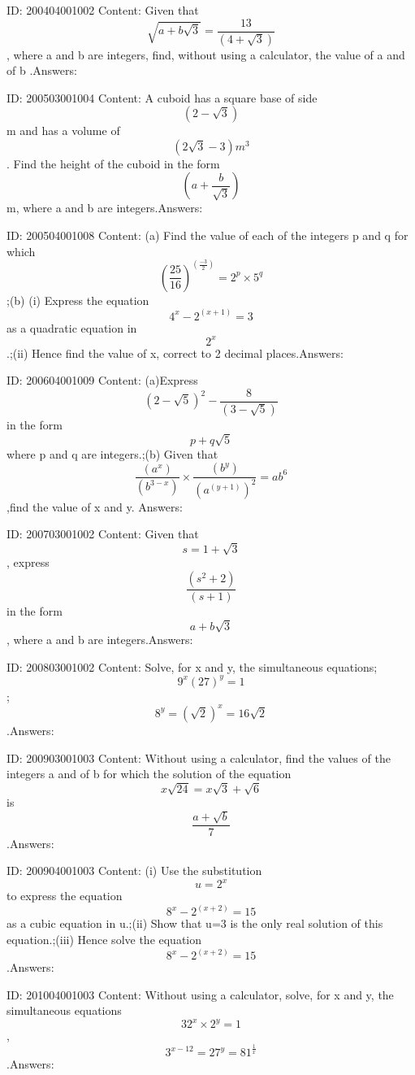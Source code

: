 \documentclass{article}
\begin{document}
ID: 200404001002
Content:
Given that $$\sqrt{a+b \sqrt3}= \frac{13}{(4+\sqrt3)}$$, where a and b are integers, find, without using a calculator, the value of a and of b .Answers:

ID: 200503001004
Content:
A cuboid has a square base of side $$(2-\sqrt3)$$m and has a volume of $$(2\sqrt3-3)m^3$$. Find the height of the cuboid in the form $$(a+\frac{b}{\sqrt{3}})$$m, where a and b are integers.Answers:

ID: 200504001008
Content:
(a)	Find the value of each of the integers p and q for which $$( \frac{25}{16})^{( \frac{-3}{2})}=2^p \times 5^q$$;(b)	(i) Express the equation $$4^x-2^{(x+1)}=3$$ as a quadratic equation in $$2^x$$.;(ii) Hence find the value of x, correct to 2 decimal places.Answers:

ID: 200604001009
Content:
(a)Express $$(2-\sqrt5)^2-\frac{8}{(3-\sqrt5)}$$ in the form $$p+q\sqrt5$$ where p and q are integers.;(b) Given that $$\frac{(a^x)}{(b^{3-x}) }\times \frac{(b^y)}{(a^{(y+1)})^{2} }=ab^6$$ ,find the value of x and y. Answers:

ID: 200703001002
Content:
Given that $$s=1+\sqrt3$$, express $$\frac{(s^2+2)}{(s+1)}$$ in the form $$a+b\sqrt3$$, where a and b are integers.Answers:

ID: 200803001002
Content:
Solve, for x and y, the simultaneous equations;$$9^x(27)^y = 1$$;$$8^y =(\sqrt2)^x = 16\sqrt2$$.Answers:

ID: 200903001003
Content:
Without using a calculator, find the values of the integers a and of b for which the solution of the equation $$x \sqrt{24} = x \sqrt{3} + \sqrt{6}$$ is $$\frac{a+\sqrt{b}}{7} $$.Answers:

ID: 200904001003
Content:
(i) Use the substitution $$u=2^x$$ to express the equation $$8^x -2^{(x+2)} = 15$$ as a cubic equation in u.;(ii) Show that u=3 is the only real solution of this equation.;(iii) Hence solve the equation $$8^x -2^{(x+2)} =15$$.Answers:

ID: 201004001003
Content:
Without using a calculator, solve, for x and y, the simultaneous equations $$32^x \times 2^y = 1$$,$$3^{x-12} = 27^y = 81^{\frac{1}{x}}$$.Answers:
\end{document}
